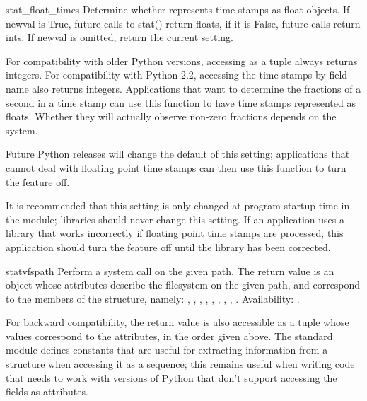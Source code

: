\begin{funcdesc}{stat_float_times}{}
Determine whether  represents time stamps as float
objects.  If newval is True, future calls to stat() return floats, if
it is False, future calls return ints.  If newval is omitted, return
the current setting.

For compatibility with older Python versions, accessing
 as a tuple always returns integers. For
compatibility with Python 2.2, accessing the time stamps by field name
also returns integers. Applications that want to determine the
fractions of a second in a time stamp can use this function to have
time stamps represented as floats. Whether they will actually observe
non-zero fractions depends on the system.

Future Python releases will change the default of this setting;
applications that cannot deal with floating point time stamps can then
use this function to turn the feature off.

It is recommended that this setting is only changed at program startup
time in the  module; libraries should never change this
setting. If an application uses a library that works incorrectly if
floating point time stamps are processed, this application should turn
the feature off until the library has been corrected.

\end{funcdesc}

\begin{funcdesc}{statvfs}{path}
Perform a  system call on the given path.  The
return value is an object whose attributes describe the filesystem on
the given path, and correspond to the members of the
 structure, namely:
,
,
,
,
,
,
,
,
.
Availability: \UNIX.

For backward compatibility, the return value is also accessible as a
tuple whose values correspond to the attributes, in the order given above.
The standard module 
defines constants that are useful for extracting information
from a  structure when accessing it as a sequence; this
remains useful when writing code that needs to work with versions of
Python that don't support accessing the fields as attributes.

\end{funcdesc}

